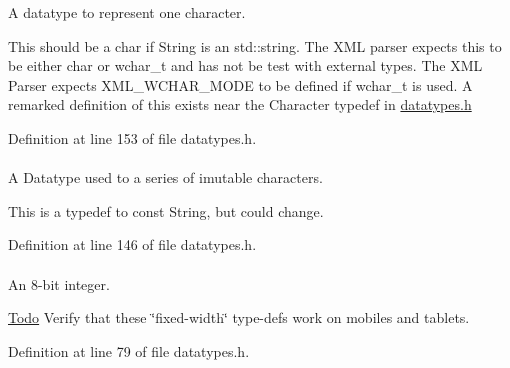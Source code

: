 A datatype to represent one character. 

This should be a char if String is an std::string. The XML parser expects this to be either char or wchar\_\-t and has not be test with external types. The XML Parser expects XML\_\-WCHAR\_\-MODE to be defined if wchar\_\-t is used. A remarked definition of this exists near the Character typedef in \hyperlink{datatypes_8h_source}{datatypes.h} 

Definition at line 153 of file datatypes.h.

\hypertarget{namespaceMezzanine_a63cd699ac54b73953f35ec9cfc05e506}{
\paragraph[{ConstString}]{}\hfill}
\label{namespaceMezzanine_a63cd699ac54b73953f35ec9cfc05e506}


A Datatype used to a series of imutable characters. 

This is a typedef to const String, but could change. 

Definition at line 146 of file datatypes.h.

\hypertarget{namespaceMezzanine_acbb048ee99aa07566d5a6eb33f5a2c2d}{
\paragraph[{Int8}]{}\hfill}
\label{namespaceMezzanine_acbb048ee99aa07566d5a6eb33f5a2c2d}


An 8-\/bit integer. 

\begin{Desc}
\item[\hyperlink{todo__todo000012}{Todo}]Verify that these \char`\"{}fixed-\/width\char`\"{} type-\/defs work on mobiles and tablets.\end{Desc}


Definition at line 79 of file datatypes.h.

\hypertarget{namespaceMezzanine_ac3576e52af3c62d13dde94829e0c5465}{
\paragraph[{Integer}]{}\hfill}
\label{namespaceMezzanine_ac3576e52af3c62d13dde94829e0c5465}


